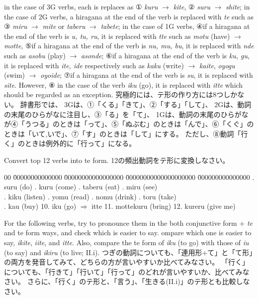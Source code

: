 \documentclass[uplatex,dvipdfmx,b5paper,english,10pt]{jsbook}
\begin{document}
in the case of 3G verbs, each is replaces as ① {\it kuru\/} $\rightarrow$ {\it kite\/}, ② {\it suru\/} $\rightarrow$ {\it shite\/};
in the case of 2G verbs, a hiragana at the end of the verb is replaced with {\it te\/} such as ③ {\it miru\/} $\rightarrow$ {\it mite\/} or {\it taberu\/} $\rightarrow$ {\it tabete\/};
in the case of 1G verbs,
④if a hiragana at the end of the verb is {\it u, tu, ru\/}, it is replaced with {\it tte\/} such as {\it motu\/} (have) $\rightarrow$ {\it motte\/},
⑤if a hiragana at the end of the verb is {\it nu, mu, bu\/}, it is replaced with {\it nde\/} such as {\it asobu\/} (play) $\rightarrow$ {\it asonde\/};
⑥if a hiragana at the end of the verb is {\it ku, gu\/}, it is replaced with {\it ite, ide\/} respectively such as {\it kaku\/} (write) $\rightarrow$ {\it kaite\/}, {\it oyogu\/} (swim) $\rightarrow$ {\it oyoide\/};
⑦if a hiragana at the end of the verb is {\it su\/}, it is replaced with {\it site\/}.
However, ⑧ in the case of the verb {\it iku\/} (go), it is replaced with {\it itte\/} which should be regarded as an exception.
\else
究極的には、テ形の作り方には8つしかない。
辞書形では、
3Gは、①「くる」「きて」、②「する」「して」、
2Gは、動詞の末尾のひらがなに注目し、③「る」を「て」、
1Gは、動詞の末尾のひらがなが④「うつる」のときは「って」、⑤「ぬぶむ」のときは「んで」、⑥「くぐ」のときは「いて,いで」、⑦「す」のときは「して」にする。
ただし、⑧動詞「行く」のときは例外的に「行って」になる。
\fi


\begin{toiquestion}
\ifEnglish
Convert top 12 verbs into te form.
\else
12の頻出動詞をテ形に変換しなさい。
\fi
\end{toiquestion}

\begin{tabbing}
 00 \=
 00000000000000 \=
 00000000000000000 \=
 00000000000000000000 \=
 000000000000000 \kill
 . suru (do)      . kuru (come)    . taberu (eat)   . miru (see)     \\
 . kiku (listen)  . yomu (read)    . nomu (drink)   . toru (take)    \\
 . kau (buy)        \>
\hspace{-.5em}10. iku (go) $\Rightarrow$ itte    \>
\hspace{-.5em}11. mottekuru (bring)   \>
\hspace{-.5em}12. kureru (give me)    \\
\end{tabbing}

\begin{toiquestion}
\ifEnglish
For the following verbs, try to pronounce them in the both conjunctive form + {\it te\/} and te form ways, and check which is easier to say.
ompare which one is easier to say, {\it ikite\/}, {\it iite\/}, and {\it itte\/}.
Also, compare the te form of {\it iku\/} (to go)  with those of {\it iu\/} (to say) and {\it ikiru\/} (to live; II.i).
\else
つぎの動詞についても、「連用形+て」と「て形」の両方を発音してみて、どちらの方が言いやすいか比べてみなさい。
「行く」についても、「行きて」「行いて」「行って」のどれが言いやすいか、比べてみなさい。
さらに、「行く」のテ形と、「言う」、「生きる(II.i)」のテ形とも比較しなさい。
\fi
\end{toiquestion}
\end{document}
